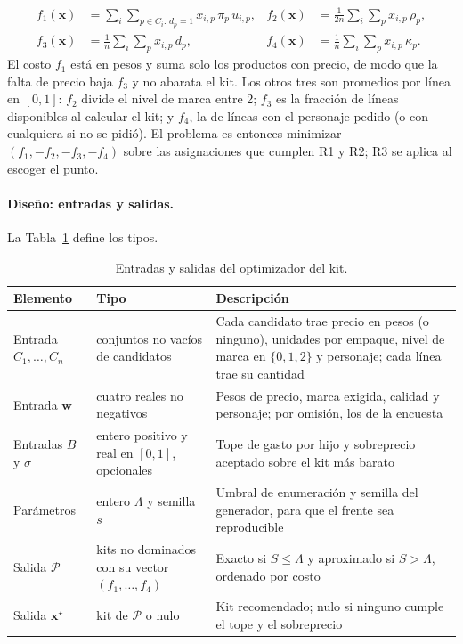 \begin{align}
f_1(\mathbf{x})&=\sum_{i}\sum_{p\in C_i:\,d_p=1}x_{i,p}\,\pi_p\,u_{i,p}, &
f_2(\mathbf{x})&=\frac{1}{2n}\sum_{i}\sum_{p}x_{i,p}\,\rho_p,\label{eq:f1f2}\\
f_3(\mathbf{x})&=\frac{1}{n}\sum_{i}\sum_{p}x_{i,p}\,d_p, &
f_4(\mathbf{x})&=\frac{1}{n}\sum_{i}\sum_{p}x_{i,p}\,\kappa_p.\label{eq:f3f4}
\end{align}
El costo $f_1$ está en pesos y suma solo los productos con precio, de modo que la
falta de precio baja $f_3$ y no abarata el kit. Los otros tres son promedios por línea en $[0,1]$:
$f_2$ divide el nivel de marca entre 2; $f_3$ es la fracción de líneas
disponibles al calcular el kit; y $f_4$, la de líneas con el personaje pedido (o con cualquiera
si no se pidió). El problema es entonces minimizar
$(f_1,-f_2,-f_3,-f_4)$ sobre las asignaciones que cumplen R1 y R2; R3 se aplica al escoger el punto.

\paragraph{Diseño: entradas y salidas.} La Tabla~\ref{tab:es-optimizador} define los tipos.

\begin{table}[!htb]
\centering\footnotesize
\caption{Entradas y salidas del optimizador del kit.}
\label{tab:es-optimizador}
\begin{tabularx}{\textwidth}{@{}p{2.6cm}p{4.4cm}X@{}}
\toprule
Elemento & Tipo & Descripción \\
\midrule
Entrada $C_1,\dots,C_n$ & conjuntos no vacíos de candidatos & Cada candidato trae precio en pesos (o ninguno), unidades por empaque, nivel de marca en $\{0,1,2\}$ y personaje; cada línea trae su cantidad \\
Entrada $\mathbf{w}$ & cuatro reales no negativos & Pesos de precio, marca exigida, calidad y personaje; por omisión, los de la encuesta \\
Entradas $B$ y $\sigma$ & entero positivo y real en $[0,1]$, opcionales & Tope de gasto por hijo y sobreprecio aceptado sobre el kit más barato \\
Parámetros & entero $\Lambda$ y semilla $s$ & Umbral de enumeración y semilla del generador, para que el frente sea reproducible \\
Salida $\mathcal{P}$ & kits no dominados con su vector $(f_1,\dots,f_4)$ & Exacto si $S\leq\Lambda$ y aproximado si $S>\Lambda$, ordenado por costo \\
Salida $\mathbf{x}^\star$ & kit de $\mathcal{P}$ o nulo & Kit recomendado; nulo si ninguno cumple el tope y el sobreprecio \\
\bottomrule
\end{tabularx}
\end{table}

